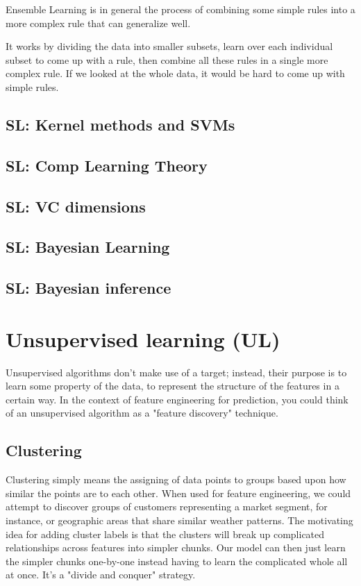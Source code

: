 \documentclass[12pt]{report}
\begin{document}
Ensemble Learning is in general the process of combining some simple rules into a more complex rule that can generalize well.

It works by dividing the data into smaller subsets, learn over each individual subset to come up with a rule, then combine all these rules in a single more complex rule. If we looked at the whole data, it would be hard to come up with simple rules.




\section{SL: Kernel methods and SVMs}
\section{SL: Comp Learning Theory}
\section{SL: VC dimensions}
\section{SL: Bayesian Learning}
\section{SL: Bayesian inference}


\chapter[Unsupervised learning]{Unsupervised learning (UL)}

Unsupervised algorithms don't make use of a target; instead, their purpose is to learn some property of the data, to represent the structure of the features in a certain way. In the context of feature engineering for prediction, you could think of an unsupervised algorithm as a "feature discovery" technique.

\section{Clustering}
Clustering simply means the assigning of data points to groups based upon how similar the points are to each other. When used for feature engineering, we could attempt to discover groups of customers representing a market segment, for instance, or geographic areas that share similar weather patterns. The motivating idea for adding cluster labels is that the clusters will break up complicated relationships across features into simpler chunks. Our model can then just learn the simpler chunks one-by-one instead having to learn the complicated whole all at once. It's a "divide and conquer" strategy.
\end{document}
